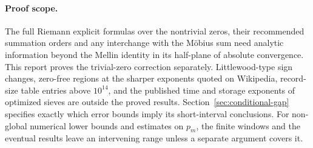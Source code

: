 \paragraph{Proof scope.}
The full Riemann explicit formulas over the nontrivial zeros, their recommended summation orders and any interchange with the Möbius sum need analytic information beyond the Mellin identity in its half-plane of absolute convergence. This report proves the trivial-zero correction separately. Littlewood-type sign changes, zero-free regions at the sharper exponents quoted on Wikipedia, record-size table entries above $10^{14}$, and the published time and storage exponents of optimized sieves are outside the proved results. Section~\ref{sec:conditional-gap} specifies exactly which error bounds imply its short-interval conclusions. For non-global numerical lower bounds and estimates on $p_m$, the finite windows and the eventual results leave an intervening range unless a separate argument covers it.


